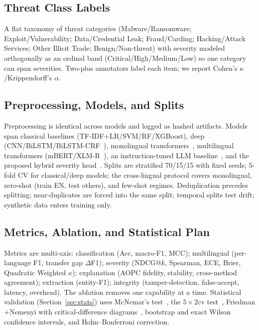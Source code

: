 \documentclass[11pt,a4paper]{article}
\begin{document}
\subsection{Threat Class Labels}
A flat taxonomy of threat categories (Malware/Ransomware; Exploit/Vulnerability;
Data/Credential Leak; Fraud/Carding; Hacking/Attack Services; Other Illicit Trade;
Benign/Non-threat) with severity modeled orthogonally as an ordinal band
(Critical/High/Medium/Low) so one category can span severities. Two-plus annotators label
each item; we report Cohen's $\kappa$/Krippendorff's $\alpha$.

\subsection{Preprocessing, Models, and Splits}
Preprocessing is identical across models and logged as hashed artifacts. Models span
classical baselines (TF-IDF$+$LR/SVM/RF/XGBoost), deep
(CNN/BiLSTM/BiLSTM-CRF~\cite{kim2020automatic}), monolingual
transformers~\cite{devlin2019bert,sangher2023towards}, multilingual transformers
(mBERT/XLM-R~\cite{conneau2020xlmr}), an instruction-tuned LLM
baseline~\cite{shah2025madcti,sorokoletova2024scalable}, and the proposed hybrid severity
head~\cite{zeng2022licality,saklani2025severity}. Splits are stratified 70/15/15 with
fixed seeds; $5$-fold CV for classical/deep models; the cross-lingual protocol covers
monolingual, zero-shot (train EN, test others), and few-shot regimes. Deduplication
precedes splitting; near-duplicates are forced into the same split; temporal splits test
drift; synthetic data enters training only.

\subsection{Metrics, Ablation, and Statistical Plan}
Metrics are multi-axis: classification (Acc, macro-F1, MCC); multilingual (per-language
F1, transfer gap $\Delta$F1); severity (NDCG@$k$, Spearman, ECE, Brier, Quadratic Weighted
$\kappa$); explanation (AOPC fidelity, stability, cross-method agreement); extraction
(entity-F1); integrity (tamper-detection, false-accept, latency, overhead). The ablation
removes one capability at a time. Statistical validation (Section~\ref{sec:stats}) uses
McNemar's test~\cite{mcnemar1947note}, the $5\times2$cv test~\cite{dietterich1998approximate},
Friedman$+$Nemenyi with critical-difference diagrams~\cite{demsar2006statistical}, bootstrap
and exact Wilson confidence intervals, and Holm--Bonferroni correction.
\end{document}
